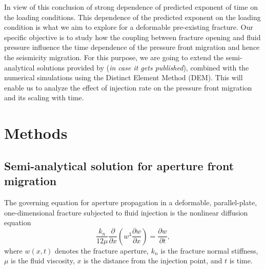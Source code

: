 \documentclass[draft]{agujournal2019}
\begin{document}

In view of this conclusion of strong dependence of predicted exponent of time on the loading conditions. This dependence of the predicted exponent on the loading condition is what we aim to explore for a deformable pre-existing fracture. Our specific objective is to study how the coupling between fracture opening and fluid pressure influence the time dependence of the pressure front migration and hence the seismicity migration. For this purpose, we are going to extend the semi-analytical solutions provided by  (\textit{in case it gets published}), combined with the numerical simulations using the Distinct Element Method (DEM). This will enable us to analyze the effect of injection rate on the pressure front migration and its scaling with time.


\section{Methods}
\subsection{Semi-analytical solution for aperture front migration}

The governing equation for aperture propagation in a deformable, parallel-plate, one-dimensional fracture subjected to fluid injection is the nonlinear diffusion equation \cite{MurphyEtAl2004}
\begin{equation}
	\frac{k_n}{12 \mu} \frac{\partial}{\partial x}\left(w^3 \frac{\partial w}{\partial x}\right)
	= \frac{\partial w}{\partial t},
	\label{eq:aperture-n3}
\end{equation}
where $w(x,t)$ denotes the fracture aperture, $k_n$ is the fracture normal stiffness, $\mu$ is the fluid viscosity, $x$ is the distance from the injection point, and $t$ is time.
\end{document}
